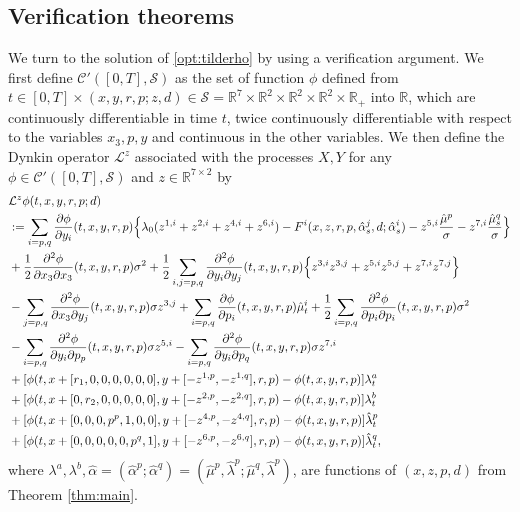 \documentclass[12pt]{article}
\begin{document}
\subsection{Verification theorems}
We turn to the solution of \eqref{opt:tilderho} by using a verification argument. We first define $\mathcal C'([0,T],\mathcal S)$ as the set of function $\phi$ defined from $t\in [0,T] \times (x,y,r,p;z,d)\in \mathcal S= \mathbb R^7\times \mathbb R^2\times \mathbb R^2\times \mathbb R^2\times \mathbb R_+$ into $\mathbb R$, which are continuously differentiable in time $t$, twice continuously differentiable with respect to the variables $x_3,p,y$ and continuous in the other variables. We then define the Dynkin operator $\mathcal L^z$ associated with the processes $X,Y$ for any $\phi\in \mathcal C'([0,T],\mathcal S) $ and $z\in \mathbb R^{7\times 2}$ by 
\begin{align*}
    &\mathcal L^z\phi(t,x,y,r,p;d)\\
    &:= \sum_{i = p,q} \frac{\partial \phi}{\partial y_i} (t, x, y,r,p) \Bigl\{\lambda_0(z^{1,i} + z^{2,i} +z^{4,i} +z^{6,i} ) - F^i(x,z,r,p, \hat \alpha^j_s,d;\hat \alpha^i_s) -  z^{5,i} \frac{\hat\mu^p}{\sigma} - z^{7,i} \frac{\hat\mu^q_s}{\sigma} \Bigl\} \\
    &+\frac{1}{2} \frac{\partial^2 \phi}{\partial x_3 \partial x_3} (t, x,y,r,p) \sigma^2 + \frac{1}{2}\sum_{i,j=p,q} \frac{\partial^2 \phi}{\partial y_i \partial y_j} (t, x,y,r,p) \Bigl\{z^{3,i} z^{3,j} + z^{5,i}z^{5,j}+z^{7,i}z^{7,j}\Bigl\}\\
    &- \sum_{j=p,q}  \frac{\partial^2 \phi}{\partial x_3 \partial y_j} (t, x,y,r,p) \sigma z^{3,j}  + \sum_{i=p,q} \frac{\partial \phi}{\partial p_i} (t, x,y,r,p)\hat\mu_t^i +\frac{1}{2}\sum_{i =p,q}  \frac{\partial^2 \phi}{\partial p_i \partial p_i} (t, x,y,r,p) \sigma^2 \\
    &-\sum_{i = p,q}\frac{\partial^2 \phi}{\partial y_i \partial p_p} (t, x,y,r,p) \sigma z^{5,i} - \sum_{i = p,q}\frac{\partial^2 \phi}{\partial y_i \partial p_q} (t, x,y,r,p) \sigma z^{7,i} \\
    &+  [\phi(t,x+[r_1 , 0,0, 0,0,0,0],y +[-z^{1,p},-z^{1,q}],r,p)  - \phi(t, x,y,r,p)]  \lambda^a_t \\
    &+ [\phi(t,x+[0 , r_2,0, 0,0,0,0],y +[-z^{2,p},-z^{2,q}],r,p)  - \phi(t, x,y,r,p)]  \lambda^b_t\\
    &+ [\phi(t,x+[0 , 0,0, p^p,1,0,0],y +[-z^{4,p},-z^{4,q}],r,p)  - \phi(t, x,y,r,p)] \hat\lambda^p_t\\
    &+ [\phi(t,x+[0 , 0,0, 0,0,p^q,1],y +[-z^{6,p},-z^{6,q}],r,p)  - \phi(t, x,y,r,p)] \hat\lambda^q_t,
\end{align*}
where  $\lambda^a,\lambda^b,\hat\alpha=(\hat\alpha^p;\hat\alpha^q)=(\hat\mu^p,\hat\lambda^p;\hat\mu^q,\hat\lambda^p)$, are functions of $(x,z,p,d)$ from Theorem \ref{thm:main}.
\end{document}
